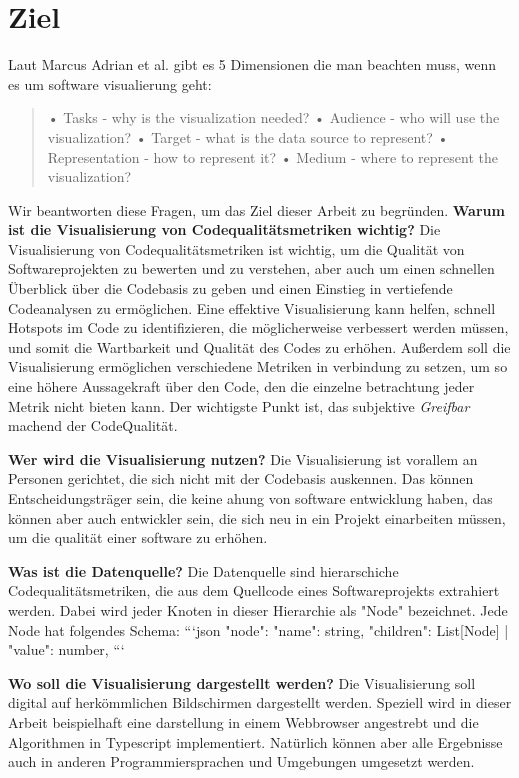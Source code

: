 \section{Ziel} \label{sec:Ziel}

Laut Marcus Adrian et al.  gibt es 5 Dimensionen die man beachten muss, wenn es um software visualierung geht: 
\begin{quote}    
    • Tasks - why is the visualization needed?
    • Audience - who will use the visualization?
    • Target - what is the data source to represent?
    • Representation - how to represent it?
    • Medium - where to represent the visualization? \cite[2]{3dsoftwareMarcus}
\end{quote}

Wir beantworten diese Fragen, um das Ziel dieser Arbeit zu begründen.
\textbf{Warum ist die Visualisierung von Codequalitätsmetriken wichtig?}
Die Visualisierung von Codequalitätsmetriken ist wichtig, um die Qualität von Softwareprojekten zu bewerten und zu verstehen, aber auch um einen schnellen Überblick über die Codebasis zu geben und einen Einstieg in vertiefende Codeanalysen zu ermöglichen. Eine effektive Visualisierung kann helfen, schnell Hotspots im Code zu identifizieren, die möglicherweise verbessert werden müssen, und somit die Wartbarkeit und Qualität des Codes zu erhöhen. Außerdem soll die Visualisierung ermöglichen verschiedene Metriken in verbindung zu setzen, um so eine höhere Aussagekraft über den Code, den die einzelne betrachtung jeder Metrik nicht bieten kann.
Der wichtigste Punkt ist, das subjektive \textit{Greifbar} machend der CodeQualität.

\textbf{Wer wird die Visualisierung nutzen?}
Die Visualisierung ist vorallem an Personen gerichtet, die sich nicht mit der Codebasis auskennen. Das können Entscheidungsträger sein, die keine ahung von software entwicklung haben, das können aber auch entwickler sein, die sich neu in ein Projekt einarbeiten müssen, um die qualität einer software zu erhöhen.

\textbf{Was ist die Datenquelle?}
Die Datenquelle sind hierarschiche Codequalitätsmetriken, die aus dem Quellcode eines Softwareprojekts extrahiert werden. 
Dabei wird jeder Knoten in dieser Hierarchie als "Node" bezeichnet.
Jede Node hat folgendes Schema:
```json
"node": {
    "name": string,
    "children": List[Node] | "value": number,
}
```


\textbf{Wo soll die Visualisierung dargestellt werden?}
Die Visualisierung soll digital auf herkömmlichen Bildschirmen dargestellt werden. Speziell wird in dieser Arbeit beispielhaft eine darstellung in einem Webbrowser angestrebt und die Algorithmen in Typescript implementiert. Natürlich können aber alle Ergebnisse auch in anderen Programmiersprachen und Umgebungen umgesetzt werden.



